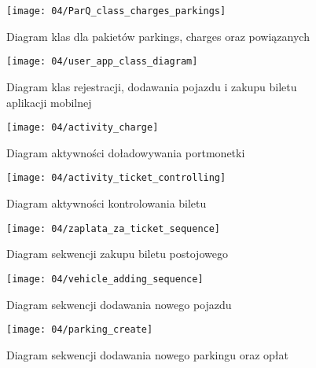 \begin{figure}[p]
	\begin{center}
		\texttt{[image: 04/ParQ\_class\_charges\_parkings]}
	\end{center}
	\caption{Diagram klas dla pakietów parkings, charges oraz powiązanych}
\end{figure}

\begin{figure}[p]
	\begin{center}
		\texttt{[image: 04/user\_app\_class\_diagram]}
	\end{center}
	\caption{Diagram klas rejestracji, dodawania pojazdu i zakupu biletu aplikacji mobilnej}
\end{figure}

\begin{figure}[p]
	\begin{center}
		\texttt{[image: 04/activity\_charge]}
	\end{center}
	\caption{Diagram aktywności doładowywania portmonetki}
\end{figure}

\begin{figure}[p]
	\begin{center}
		\texttt{[image: 04/activity\_ticket\_controlling]}
	\end{center}
	\caption{Diagram aktywności kontrolowania biletu}
\end{figure}

\begin{figure}[p]
	\begin{center}
		\texttt{[image: 04/zaplata\_za\_ticket\_sequence]}
	\end{center}
	\caption{Diagram sekwencji zakupu biletu postojowego}
\end{figure}

\begin{figure}[p]
	\begin{center}
		\texttt{[image: 04/vehicle\_adding\_sequence]}
	\end{center}
	\caption{Diagram sekwencji dodawania nowego pojazdu}
\end{figure}

\begin{figure}[p]
	\begin{center}
		\texttt{[image: 04/parking\_create]}
	\end{center}
	\caption{Diagram sekwencji dodawania nowego parkingu oraz opłat}
\end{figure}

